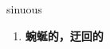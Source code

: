 
\begin{frame}
{\huge sinuous}
\begin{center}
\begin{enumerate}\Large
  \item \textbf{蜿蜒的，迂回的}
\end{enumerate}
\end{center}
\end{frame}
